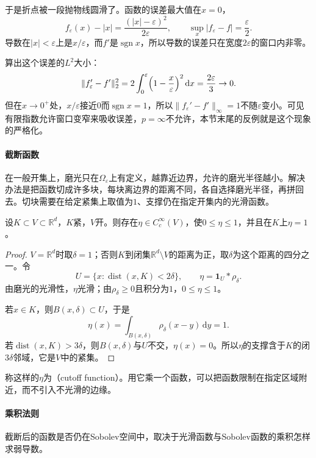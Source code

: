 于是折点被一段抛物线圆滑了。函数的误差最大值在$x=0$，
\[
f_\varepsilon(x)-|x|=\frac{(|x|-\varepsilon)^2}{2\varepsilon},\qquad
\sup_x|f_\varepsilon-f|=\frac\varepsilon2 .
\]
导数在$|x|<\varepsilon$上是$x/\varepsilon$，而$f'$是$\operatorname{sgn}x$，所以导数的误差只在宽度$2\varepsilon$的窗口内非零。

算出这个误差的$L^2$大小：
\[
\lVert f_\varepsilon'-f'\rVert_2^2=2\int_0^\varepsilon\Bigl(1-\frac x\varepsilon\Bigr)^2\,\mathrm dx=\frac{2\varepsilon}{3}\to0.
\]
但在$x\to0^+$处，$x/\varepsilon$接近$0$而$\operatorname{sgn}x=1$，所以$\lVert f_\varepsilon'-f'\rVert_\infty=1$不随$\varepsilon$变小。可见有限指数允许窗口变窄来吸收误差，$p=\infty$不允许，本节末尾的反例就是这个现象的严格化。

\paragraph{截断函数}
在一般开集上，磨光只在$\Omega_\varepsilon$上有定义，越靠近边界，允许的磨光半径越小。解决办法是把函数切成许多块，每块离边界的距离不同，各自选择磨光半径，再拼回去。切块需要在给定紧集上取值为$1$、支撑仍在指定开集内的光滑函数。

\begin{lemma}[截断函数]
\label{lem:sobolev-cutoff}
设$K\subset V\subset\mathbb R^d$，$K$紧，$V$开。则存在$\eta\in C_c^\infty(V)$，使$0\leq\eta\leq1$，并且在$K$上$\eta=1$。
\end{lemma}

\begin{proof}
$V=\mathbb R^d$时取$\delta=1$；否则$K$到闭集$\mathbb R^d\setminus V$的距离为正，取$\delta$为这个距离的四分之一。令
\[
U=\{x:\operatorname{dist}(x,K)<2\delta\},\qquad \eta=\mathbf 1_U*\rho_\delta .
\]
由磨光的光滑性，$\eta$光滑；由$\rho_\delta\geq0$且积分为$1$，$0\leq\eta\leq1$。

若$x\in K$，则$B(x,\delta)\subset U$，于是
\[
\eta(x)=\int_{B(x,\delta)}\rho_\delta(x-y)\,\mathrm dy=1 .
\]
若$\operatorname{dist}(x,K)>3\delta$，则$B(x,\delta)$与$U$不交，$\eta(x)=0$。所以$\eta$的支撑含于$K$的闭$3\delta$邻域，它是$V$中的紧集。
\end{proof}

称这样的$\eta$为（cutoff function）。用它乘一个函数，可以把函数限制在指定区域附近，而不引入不光滑的边缘。

\paragraph{乘积法则}
截断后的函数是否仍在Sobolev空间中，取决于光滑函数与Sobolev函数的乘积怎样求弱导数。

